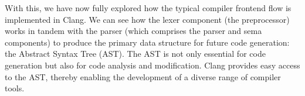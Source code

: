 With this, we have now fully explored how the typical compiler frontend flow is implemented in Clang. We can see how the lexer component (the preprocessor) works in tandem with the parser (which comprises the parser and sema components) to produce the primary data structure for future code generation: the Abstract Syntax Tree (AST). The AST is not only essential for code generation but also for code analysis and modification. Clang provides easy access to the AST, thereby enabling the development of a diverse range of compiler tools.











